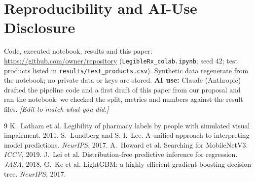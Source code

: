 \documentclass{article}
\begin{document}
\section{Reproducibility and AI-Use Disclosure}
Code, executed notebook, results and this paper: \url{https://github.com/owner/repository} (\texttt{LegibleRx\_colab.ipynb};
seed 42; test products listed in \texttt{results/test\_products.csv}). Synthetic data regenerate from the notebook; no private
data or keys are stored. \textbf{AI use:} Claude (Anthropic) drafted the pipeline code and a first draft of this paper from
our proposal and ran the notebook; we checked the split, metrics and numbers against the result files. \emph{[Edit to match
what you did.]}

\begin{thebibliography}{9}
\small
{} K.~Latham et al. Legibility of pharmacy labels by people with simulated visual impairment. 2011.
 S.~Lundberg and S.-I.~Lee. A unified approach to interpreting model predictions. \emph{NeurIPS}, 2017.
 A.~Howard et al. Searching for MobileNetV3. \emph{ICCV}, 2019.
 J.~Lei et al. Distribution-free predictive inference for regression. \emph{JASA}, 2018.
 G.~Ke et al. LightGBM: a highly efficient gradient boosting decision tree. \emph{NeurIPS}, 2017.
\end{thebibliography}
\end{document}
